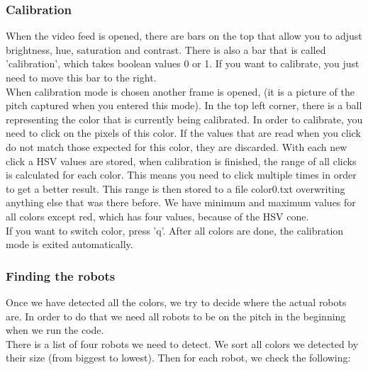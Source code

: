 \documentclass[12pt]{article}
\begin{document}
\subsubsection{Calibration}
When the video feed is opened, there are bars on the top that allow you to adjust brightness, hue, saturation and contrast. There is also a bar that is called 'calibration', which takes boolean values 0 or 
1. If you want to calibrate, you just need to move this bar to the right. 
\\When calibration mode is chosen another frame is opened, (it is a picture of the pitch captured when you entered this mode). In the top left corner, there is a ball representing the color that is currently being calibrated. In order to calibrate, you need to click on the pixels of this color. If the values that are read when you click do not match those expected for this color, they are discarded. With each new click a HSV values are stored, when calibration is finished, the range of all clicks is calculated for each color. This means you need to click multiple times in order to get a better result. This range is then stored to a file color0.txt overwriting anything else that was there before. We have minimum and maximum values for all colors except red, which has four values, because of the HSV cone. 
\\If you want to switch color, press 'q'. After all colors are done, the calibration mode is exited automatically. 

\subsubsection{Finding the robots}
Once we have detected all the colors, we try to decide where the actual robots are. In order to do that we need all robots to be on the pitch in the beginning when we run the code. 
\\There is a list of four robots we need to detect. We sort all colors we detected by their size (from biggest to lowest). Then for each robot, we check the following:
\end{document}
